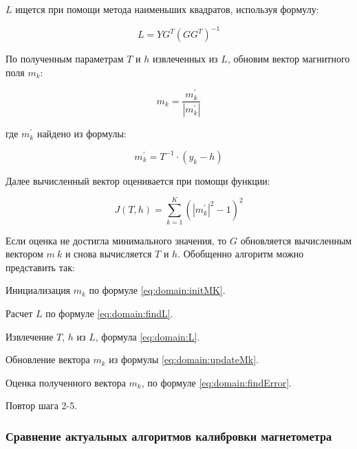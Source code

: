 $L$ ищется при помощи метода наименьших квадратов, используя формулу:

\begin{equation}
    \label{eq:domain:findL}
    L=YG^{T}(GG^{T})^{-1}
  \end{equation}

По полученным параметрам $T$ и $h$ извлеченных из $L$, обновим вектор магнитного поля $m_{k}$:

\begin{equation}
    \label{eq:domain:updateMk}
    m_{k}=\frac{m_{k}^{'}}{\left|m_{k}^{'}\right|}
  \end{equation}
  \begin{explanationx}
    \item[где] $m_{k}^{'}$ найдено из формулы:
  \end{explanationx}

\begin{equation}
    \label{eq:domain:findNewMk}
    m_{k}^{'}=T^{-1} \cdot (y_{k}-h)
  \end{equation}

Далее вычисленный вектор оценивается при помощи функции:

\begin{equation}
    \label{eq:domain:findError}
    J(T, h) = \sum_{k=1}^{K}(|m_{k}^{'}|^{2}-1)^{2}
  \end{equation}

Если оценка не достигла минимального значения, то $G$ обновляется вычисленным вектором $m~k$ и снова вычисляется $T$ и $h$.
Обобщенно алгоритм можно представить так:
\begin{enumerate_num}
    \item Инициализация $m_{k}$ по формуле \ref{eq:domain:initMK}.
    \item Расчет $L$ по формуле \ref{eq:domain:findL}.
    \item Извлечение $T$, $h$ из $L$, формула \ref{eq:domain:L}.
    \item Обновление вектора $m_{k}$ из формулы \ref{eq:domain:updateMk}.
    \item Оценка полученного вектора $m_{k}$, по формуле \ref{eq:domain:findError}.
    \item Повтор шага 2-5.
\end{enumerate_num}

\subsubsection{Сравнение актуальных алгоритмов калибровки магнетометра}

